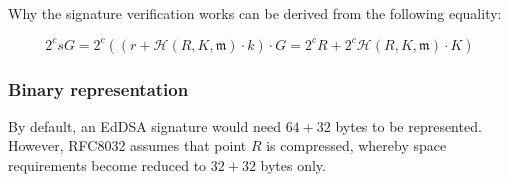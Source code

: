 Why the signature verification works can be derived from the following equality:

\[ 2^c s G = 2^c ( (r + \mathcal{H}(R, K,  \mathfrak{m}) \cdot k) \cdot G = 2^c R + 2^c \mathcal{H}(R, K,  \mathfrak{m}) \cdot K )\]



\subsubsection{Binary representation}

By default, an EdDSA signature would need \(64 + 32 \) bytes to be represented.
However, RFC8032 assumes that point \(R\) is compressed, whereby space requirements become reduced to \(32 + 32\) bytes only.

